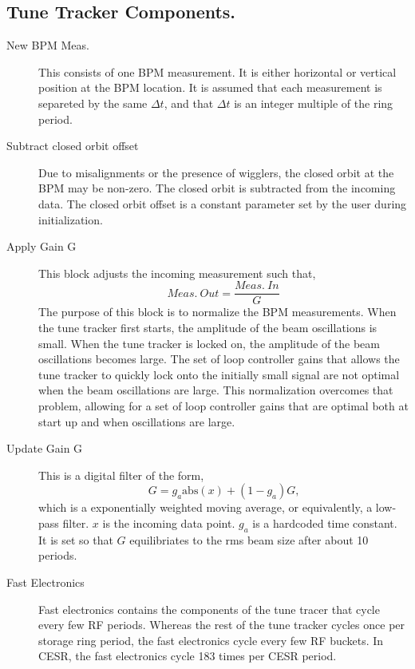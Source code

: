 \subsection{Tune Tracker Components.}
\begin{description}
\item[New BPM Meas.]  
This consists of one BPM measurement.  It is either horizontal or
vertical position at the BPM location.  It is assumed that each
measurement is separeted by the same $\Delta t$, and that $\Delta t$
is an integer multiple of the ring period.

\item[Subtract closed orbit offset]  
Due to misalignments or the presence of wigglers, the closed orbit at
the BPM may be non-zero.  The closed orbit is subtracted from the
incoming data.  The closed orbit offset is a constant parameter set by
the user during initialization.

\item[Apply Gain G]  This block adjusts the incoming measurement such that,
\begin{equation*}
Meas.\ Out = \frac{Meas.\ In}{G}
\end{equation*}
The purpose of this block is to normalize the BPM measurements.  When
the tune tracker first starts, the amplitude of the beam oscillations
is small.  When the tune tracker is locked on, the amplitude of the
beam oscillations becomes large.  The set of loop controller gains
that allows the tune tracker to quickly lock onto the initially small
signal are not optimal when the beam oscillations are large.  This
normalization overcomes that problem, allowing for a set of loop
controller gains that are optimal both at start up and when
oscillations are large.

\item[Update Gain G]  This is a digital filter of the form,
\begin{equation*}
G = g_a \textrm{abs}\left(x\right) + \left(1-g_a\right)G\textrm{,}
\end{equation*}
which is a exponentially weighted moving average, or equivalently, a
low-pass filter.  $x$ is the incoming data point.  $g_a$ is a
hardcoded time constant.  It is set so that $G$ equilibriates to the
rms beam size after about 10 periods.

\item[Fast Electronics]  
Fast electronics contains the components of the tune tracer that cycle
every few RF periods.  Whereas the rest of the tune tracker cycles
once per storage ring period, the fast electronics cycle every few RF
buckets.  In CESR, the fast electronics cycle 183 times per CESR
period.


\end{description}
